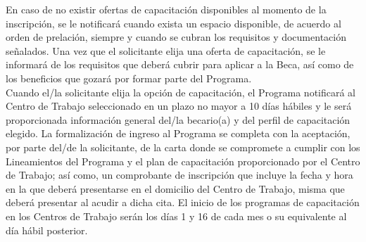     En caso de no existir ofertas de capacitación disponibles al momento de la inscripción, se le notificará cuando exista un espacio disponible, de acuerdo al orden de prelación, siempre y cuando se cubran los requisitos y documentación señalados.
    Una vez que el solicitante elija una oferta de capacitación, se le informará de los requisitos que deberá cubrir para aplicar a la Beca, así como de los beneficios que gozará por formar parte del Programa.\\
    
    Cuando el/la solicitante elija la opción de capacitación, el Programa notificará al Centro de Trabajo seleccionado en un plazo no mayor a 10 días hábiles y le será proporcionada información general del/la becario(a) y del perfil de capacitación elegido. La formalización de ingreso al Programa se completa con la aceptación, por parte del/de la solicitante, de la carta donde se compromete a cumplir con los Lineamientos del Programa y el plan de capacitación proporcionado por el Centro de Trabajo; así como, un comprobante de inscripción que incluye la fecha y hora en la que deberá presentarse en el domicilio del Centro de Trabajo, misma que deberá presentar al acudir a dicha cita. El inicio de los programas de capacitación en los Centros de Trabajo serán los días 1 y 16 de cada mes o su equivalente al día hábil posterior.\cite{JCF}
    \\
    
